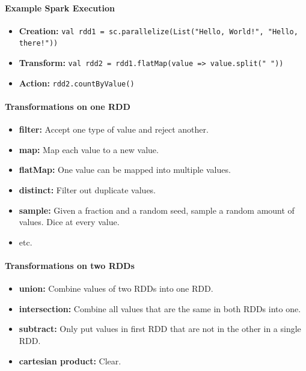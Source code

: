 \paragraph{Example Spark Execution}
\begin{itemize}
    \item \textbf{Creation:} \texttt{val rdd1 = sc.parallelize(List("Hello, World!", "Hello, there!"))}
    \item \textbf{Transform:} \texttt{val rdd2 = rdd1.flatMap(value => value.split(" "))}
    \item \textbf{Action:} \texttt{rdd2.countByValue()} 
\end{itemize}

\paragraph{Transformations on one RDD}
\begin{itemize}
    \item \textbf{filter:} Accept one type of value and reject another.
    \item \textbf{map:} Map each value to a new value.
    \item \textbf{flatMap:} One value can be mapped into multiple values.
    \item \textbf{distinct:} Filter out duplicate values.
    \item \textbf{sample:} Given a fraction and a random seed, sample a random amount of values. Dice at every value. %
    \item etc.
\end{itemize}

\paragraph{Transformations on two RDDs}
\begin{itemize}
    \item \textbf{union:} Combine values of two RDDs into one RDD. %
    \item \textbf{intersection:} Combine all values that are the same in both RDDs into one.
    \item \textbf{subtract:} Only put values in first RDD that are not in the other in a single RDD.
    \item \textbf{cartesian product:} Clear.
\end{itemize}

